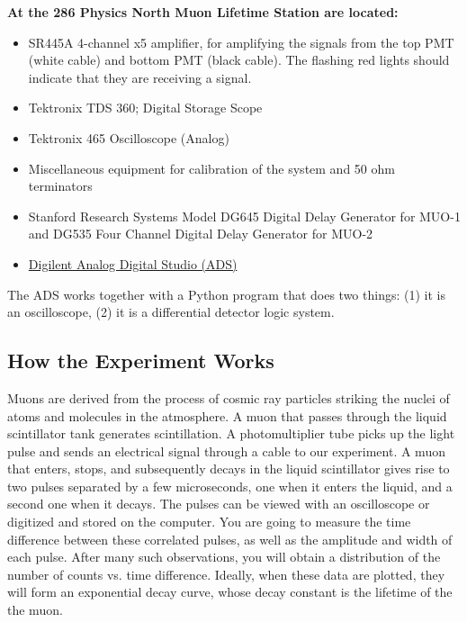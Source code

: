 \documentclass{../lab}
\begin{document}
\noindent\textbf{At the 286 Physics North Muon Lifetime Station are located:}

\begin{itemize}
    \item SR445A 4-channel x5 amplifier, for amplifying the signals from the top PMT (white cable) and bottom PMT (black cable). The flashing red lights should indicate that they are receiving a signal.

    \item Tektronix TDS 360; Digital Storage Scope

    \item Tektronix 465 Oscilloscope (Analog)

    \item Miscellaneous equipment for calibration of the system and 50 ohm terminators

    \item Stanford Research Systems Model DG645 Digital Delay Generator for MUO-1 and DG535 Four Channel Digital Delay Generator for MUO-2


    \item \href{https://digilent.com/shop/analog-discovery-studio/}{Digilent Analog Digital Studio (ADS)}

\end{itemize}

\noindent The ADS works together with a Python program that does two things: (1) it is an oscilloscope, (2) it is a differential detector logic system.

\newpage

\subsection{How the Experiment Works}

Muons are derived from the process of cosmic ray particles striking the nuclei of atoms and molecules in the atmosphere. A muon that passes through the liquid scintillator tank generates scintillation. A photomultiplier tube picks up the light pulse and sends an electrical signal through a cable to our experiment. A muon that enters, stops, and subsequently decays in the liquid scintillator gives rise to two pulses separated by a few microseconds, one when it enters the liquid, and a second one when it decays. The pulses can be viewed with an oscilloscope or digitized and stored on the computer. You are going to measure the time difference between these correlated pulses, as well as the amplitude and width of each pulse. After many such observations, you will obtain a distribution of the number of counts vs. time difference. Ideally, when these data are plotted, they will form an exponential decay curve, whose decay constant is the lifetime of the the muon.
\end{document}

